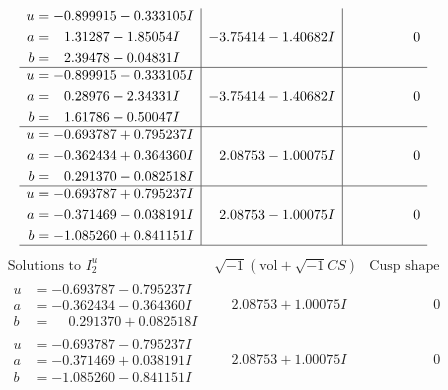 \documentclass[1p]{elsarticle_modified}
\theoremstyle{definition}
\newcommand{\I}{\sqrt{-1}}
\begin{document}
$$\begin{array}{c|c|c}
\begin{aligned}
u &= -0.899915 - 0.333105 I \\
a &= \phantom{-}1.31287 - 1.85054 I \\
b &= \phantom{-}2.39478 - 0.04831 I\end{aligned}
 & -3.75414 - 1.40682 I & \phantom{-0.000000 } 0 \\ \hline\begin{aligned}
u &= -0.899915 - 0.333105 I \\
a &= \phantom{-}0.28976 - 2.34331 I \\
b &= \phantom{-}1.61786 - 0.50047 I\end{aligned}
 & -3.75414 - 1.40682 I & \phantom{-0.000000 } 0 \\ \hline\begin{aligned}
u &= -0.693787 + 0.795237 I \\
a &= -0.362434 + 0.364360 I \\
b &= \phantom{-}0.291370 - 0.082518 I\end{aligned}
 & \phantom{-}2.08753 - 1.00075 I & \phantom{-0.000000 } 0 \\ \hline\begin{aligned}
u &= -0.693787 + 0.795237 I \\
a &= -0.371469 - 0.038191 I \\
b &= -1.085260 + 0.841151 I\end{aligned}
 & \phantom{-}2.08753 - 1.00075 I & \phantom{-0.000000 } 0\\
 \hline 
 \end{array}$$\newpage$$\begin{array}{c|c|c}  
\text{Solutions to }I^u_{2}& \I (\text{vol} + \sqrt{-1}CS) & \text{Cusp shape}\\
 \hline 
\begin{aligned}
u &= -0.693787 - 0.795237 I \\
a &= -0.362434 - 0.364360 I \\
b &= \phantom{-}0.291370 + 0.082518 I\end{aligned}
 & \phantom{-}2.08753 + 1.00075 I & \phantom{-0.000000 } 0 \\ \hline\begin{aligned}
u &= -0.693787 - 0.795237 I \\
a &= -0.371469 + 0.038191 I \\
b &= -1.085260 - 0.841151 I\end{aligned}
 & \phantom{-}2.08753 + 1.00075 I & \phantom{-0.000000 } 0 \\ \hline\begin{aligned}

\end{aligned}
\end{array}$$
\end{document}
